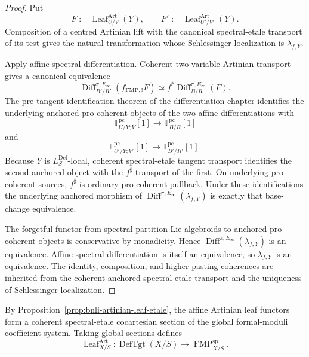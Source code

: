 \begin{proof}
Put
\[
    F:=\operatorname{Leaf}^{\mathrm{Art}}_{U/V}(Y),
    \qquad
    F':=\operatorname{Leaf}^{\mathrm{Art}}_{U'/V'}(Y).
\]
Composition of a centred Artinian lift with the canonical spectral-etale
transport of its test gives the natural transformation whose Schlessinger
localization is $\lambda_{f,Y}$.

Apply affine spectral differentiation.  Coherent two-variable Artinian
transport gives a canonical equivalence
\[
    \operatorname{Diff}^{\pi,E_\infty}_{B'/R'}
    \left(
      f_{\mathrm{FMP},!}F
    \right)
    \simeq
    f^*
    \operatorname{Diff}^{\pi,E_\infty}_{B/R}(F).
\]
The pre-tangent identification theorem of the differentiation chapter
identifies the underlying anchored pro-coherent objects of the two affine
differentiations with
\[
    \mathbb T^{\mathrm{pc}}_{U/Y;V}[1]
    \longrightarrow
    \mathbb T^{\mathrm{pc}}_{B/R}[1]
\]
and
\[
    \mathbb T^{\mathrm{pc}}_{U'/Y;V'}[1]
    \longrightarrow
    \mathbb T^{\mathrm{pc}}_{B'/R'}[1].
\]
Because $Y$ is $L_S^{\mathrm{Def}}$-local, coherent spectral-etale tangent
transport identifies the second anchored object with the $f^\sharp$-transport
of the first.  On underlying pro-coherent sources, $f^\sharp$ is ordinary
pro-coherent pullback.  Under these identifications the underlying anchored
morphism of
$\operatorname{Diff}^{\pi,E_\infty}(\lambda_{f,Y})$
is exactly that base-change equivalence.

The forgetful functor from spectral partition-Lie algebroids to anchored
pro-coherent objects is conservative by monadicity.  Hence
$\operatorname{Diff}^{\pi,E_\infty}(\lambda_{f,Y})$ is an equivalence.
Affine spectral differentiation is itself an equivalence, so
$\lambda_{f,Y}$ is an equivalence.  The identity, composition, and
higher-pasting coherences are inherited from the coherent anchored
spectral-etale transport and the uniqueness of Schlessinger localization.
\end{proof}

\begin{definition}
\label{def:bnli-global-artinian-restriction}
By Proposition~\ref{prop:bnli-artinian-leaf-etale}, the affine Artinian leaf
functors form a coherent spectral-etale cocartesian section of the global
formal-moduli coefficient system.  Taking global sections defines
\[
\boxed{
    \operatorname{Leaf}^{\mathrm{Art}}_{X/S}:
    \operatorname{DefTgt}(X/S)
    \longrightarrow
    \operatorname{FMP}^{\mathrm{sp}}_{X/S}.}
\]
\end{definition}

